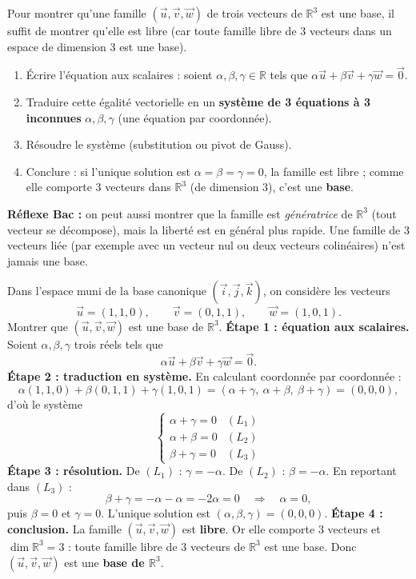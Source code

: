 \documentclass[11pt]{article}
\newcommand{\cle}[1]{{\popxbold\color{popdark}#1}}
\begin{document}
\begin{methode}
Pour montrer qu'une famille $(\vec{u},\vec{v},\vec{w})$ de trois vecteurs de $\mathbb{R}^3$ est une base, il suffit de montrer qu'elle est \cle{libre} (car toute famille libre de 3 vecteurs dans un espace de dimension 3 est une base).
\begin{enumerate}
\item Écrire l'équation aux scalaires : soient $\alpha,\beta,\gamma\in\mathbb{R}$ tels que $\alpha\vec{u}+\beta\vec{v}+\gamma\vec{w}=\vec{0}$.
\item Traduire cette égalité vectorielle en un \textbf{système de 3 équations à 3 inconnues} $\alpha,\beta,\gamma$ (une équation par coordonnée).
\item Résoudre le système (substitution ou pivot de Gauss).
\item Conclure : si l'unique solution est $\alpha=\beta=\gamma=0$, la famille est libre ; comme elle comporte 3 vecteurs dans $\mathbb{R}^3$ (de dimension 3), c'est une \textbf{base}.
\end{enumerate}
\textbf{Réflexe Bac :} on peut aussi montrer que la famille est \emph{génératrice} de $\mathbb{R}^3$ (tout vecteur se décompose), mais la liberté est en général plus rapide. Une famille de 3 vecteurs liée (par exemple avec un vecteur nul ou deux vecteurs colinéaires) n'est jamais une base.
\end{methode}

\begin{exoresolu}
Dans l'espace muni de la base canonique $(\vec{i},\vec{j},\vec{k})$, on considère les vecteurs
\[
\vec{u}=(1,1,0),\qquad \vec{v}=(0,1,1),\qquad \vec{w}=(1,0,1).
\]
Montrer que $(\vec{u},\vec{v},\vec{w})$ est une base de $\mathbb{R}^3$.
\tcblower
\textbf{Étape 1 : équation aux scalaires.} Soient $\alpha,\beta,\gamma$ trois réels tels que
\[
\alpha\vec{u}+\beta\vec{v}+\gamma\vec{w}=\vec{0}.
\]
\textbf{Étape 2 : traduction en système.} En calculant coordonnée par coordonnée :
\[
\alpha(1,1,0)+\beta(0,1,1)+\gamma(1,0,1)=(\alpha+\gamma,\ \alpha+\beta,\ \beta+\gamma)=(0,0,0),
\]
d'où le système
\[
\begin{cases}
\alpha+\gamma=0 & (L_1)\\
\alpha+\beta=0 & (L_2)\\
\beta+\gamma=0 & (L_3)
\end{cases}
\]
\textbf{Étape 3 : résolution.} De $(L_1)$ : $\gamma=-\alpha$. De $(L_2)$ : $\beta=-\alpha$. En reportant dans $(L_3)$ :
\[
\beta+\gamma=-\alpha-\alpha=-2\alpha=0 \quad\Longrightarrow\quad \alpha=0,
\]
puis $\beta=0$ et $\gamma=0$. L'unique solution est $(\alpha,\beta,\gamma)=(0,0,0)$.
\textbf{Étape 4 : conclusion.} La famille $(\vec{u},\vec{v},\vec{w})$ est \textbf{libre}. Or elle comporte $3$ vecteurs et $\dim\mathbb{R}^3=3$ : toute famille libre de 3 vecteurs de $\mathbb{R}^3$ est une base. Donc $(\vec{u},\vec{v},\vec{w})$ est une \textbf{base de $\mathbb{R}^3$}.
\end{exoresolu}
\end{document}
